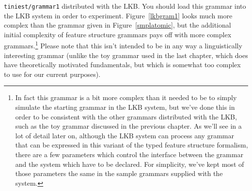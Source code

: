 \documentclass[12pt]{report}
\begin{document}
{\tt tiniest/grammar1} distributed with the LKB.
You should load this grammar into the LKB system in order to
experiment.
Figure~\ref{lkbgram1} looks much more complex than the grammar given 
in Figure~\ref{smplatomic}, but 
the 
additional initial complexity of feature structure grammars pays off 
with more complex grammars.\footnote{In fact this grammar is a bit
more complex than it needed to be 
to simply simulate the starting grammar in the LKB system, but we've
done this in order to be consistent with the other grammars distributed 
with the LKB, such as the toy grammar discussed in the previous
chapter.  As we'll see in a lot of detail later on,
although the LKB system can process any grammar that
can be expressed in this variant of the typed feature structure 
formalism, there are a few parameters which control the interface 
between the grammar and the system which have to be declared.  
For simplicity, we've kept most of those parameters the same in
the sample grammars supplied with the system.}
Please note that this isn't intended to be in any way a linguistically
interesting grammar
(unlike the toy grammar used in the last
chapter, which does have theoretically motivated fundamentals,
but which is somewhat too complex to use for our current
purposes).  
\end{document}
